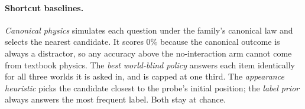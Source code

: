 \paragraph{Shortcut baselines.} \emph{Canonical physics} simulates each question under the family's canonical law and selects the nearest candidate. It scores 0\% because the canonical outcome is always a distractor, so any accuracy above the no-interaction arm cannot come from textbook physics. The \emph{best world-blind policy} answers each item identically for all three worlds it is asked in, and is capped at one third. The \emph{appearance heuristic} picks the candidate closest to the probe's initial position; the \emph{label prior} always answers the most frequent label. Both stay at chance.
